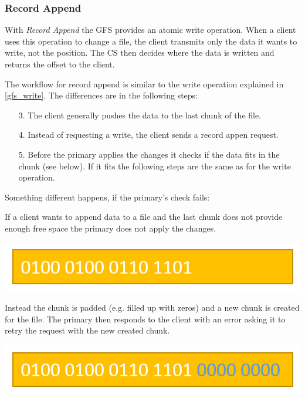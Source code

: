 \documentclass{sig-alternate}
\begin{document}
\subsubsection{Record Append}
With \textit{Record Append} the GFS provides an atomic write operation. When a client uses this operation to change a file, the client transmits only the data it wants to write, not the position. The CS then decides where the data is written and returns the offset to the client.

The workflow for record append is similar to the write operation explained in \ref{gfs_write}. The differences are in the following steps:

\begin{enumerate}
\item[3.]
The client generally pushes the data to the last chunk of the file.

\item[4.]
Instead of requesting a write, the client sends a record appen request.

\item[5.]
Before the primary applies the changes it checks if the data fits in the chunk (see below). If it fits the following steps are the same as for the write operation.
\end{enumerate}

Something different happens, if the primary's check fails:

If a client wants to append data to a file and the last chunk does not provide enough free space the primary does not apply the changes.

\includegraphics[width=\linewidth]{gfs_pics/writeappend_1.png}

Instead the chunk is padded (e.g. filled up with zeros) and a new chunk is created for the file. The primary then responds to the client with an error asking it to retry the request with the new created chunk.

\includegraphics[width=\linewidth]{gfs_pics/writeappend_2.png}
\end{document}
